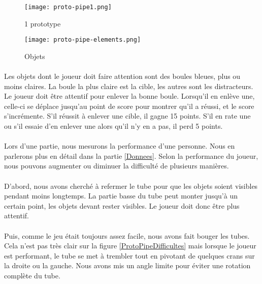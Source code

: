 \begin{figure}[H]
    \begin{center}
    \texttt{[image: proto-pipe1.png]}
    \end{center}
    \caption{1 prototype}
\label{ProtoPipe1}
\end{figure}

\begin{wrapfigure}[9]{l}{3cm}
    \vspace{-10pt}
    \texttt{[image: proto-pipe-elements.png]}
    \captionsetup{labelformat=simpleNumber}
    \caption{Objets}
\end{wrapfigure}

\paragraph{}Les objets dont le joueur doit faire attention sont des boules bleues, plus ou moins claires. La boule la plus claire est la cible, les autres sont les distracteurs. Le
joueur doit être attentif pour enlever la bonne boule. Lorsqu'il en enlève une, celle-ci se déplace jusqu'au point de score pour montrer qu'il a réussi, et le score s'incrémente.
S'il réussit à enlever une cible, il gagne 15 points. S'il en rate une ou s'il essaie d'en enlever une alors qu'il n'y en a pas, il perd 5 points.

\newpage

\paragraph{}Lors d'une partie, nous mesurons la performance d'une personne. Nous en parlerons plus en détail dans la partie \ref{Donnees}. Selon la performance du joueur, nous pouvons
augmenter ou diminuer la difficulté de plusieurs manières.

\paragraph{}D'abord, nous avons cherché à refermer le tube pour que les objets soient visibles pendant moins longtemps. La partie basse du tube peut monter jusqu'à un certain point, les objets
devant rester visibles. Le joueur doit donc être plus attentif.

\paragraph{}Puis, comme le jeu était toujours assez facile, nous avons fait bouger les tubes. Cela n'est pas très clair sur la figure \ref{ProtoPipeDifficultes} mais lorsque le joueur est
performant, le tube se met à trembler tout en pivotant de quelques crans sur la droite ou la gauche. Nous avons mis un angle limite pour éviter une rotation complète du tube.


